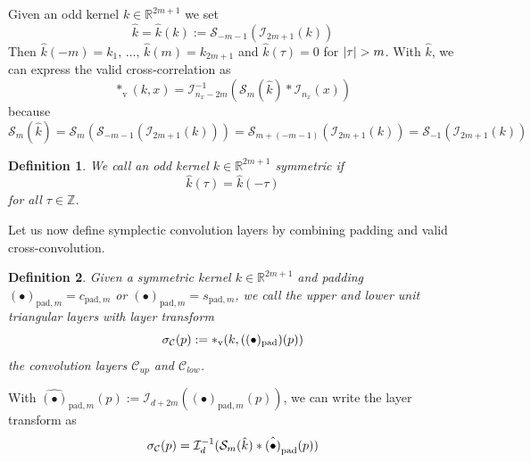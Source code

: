 \documentclass[twoside,a4paper]{article}
\newtheorem{definition}{Definition}
\begin{document}
Given an odd kernel $k \in \mathbb{R}^{2m+1}$ we set
\begin{equation*}
	\hat{k} = \hat{k}(k) := \mathcal{S}_{-m-1}(\mathcal{I}_{2m+1}(k))
\end{equation*}
Then $\hat{k}(-m) = k_1, \, \dots,\, \hat{k}(m) = k_{2m+1}$ and
$\hat{k}(\tau)=0$ for $\left|{\tau}\right| > m$. With $\hat{k}$, we can express the valid cross-correlation as
\begin{equation*}
	*_{\text{v}}(k,x) = \mathcal{I}_{n_x-2m}^{-1} (
		\mathcal{S}_{m}(\hat{k}) * \mathcal{I}_{n_x}(x)
	)
\end{equation*}
because
\begin{equation*}
	\mathcal{S}_{m}(\hat{k}) 
	= \mathcal{S}_{m}(\mathcal{S}_{-m-1}(\mathcal{I}_{2m+1}(k)))
	= \mathcal{S}_{m+(-m-1)}(\mathcal{I}_{2m+1}(k))
	= \mathcal{S}_{-1}(\mathcal{I}_{2m+1}(k))
\end{equation*}

\begin{definition}
	We call an odd kernel $k \in \mathbb{R}^{2m+1}$ symmetric if
	\begin{equation*}
		\hat{k}(\tau) = \hat{k}(-\tau)
	\end{equation*}
	for all $\tau \in \mathbb{Z}$.
\end{definition}

Let us now define symplectic convolution layers by combining padding and valid 
cross-convolution.
\begin{definition}
	Given a symmetric kernel $k \in \mathbb{R}^{2m+1}$ and padding
	$(\bullet)_{\text{pad},m} = c_{\text{pad},m}$ or $(\bullet)_{\text{pad},m} = s_{\text{pad},m}$,
	we call the upper and lower unit triangular layers with layer transform
	\begin{equation*}
		\sigma_{\mathcal{C}}(p) := *_{\text{v}}(k,((\bullet)_{\text{pad}})(p))
	\end{equation*}
	the convolution layers $\mathcal{C}_{up}$ and $\mathcal{C}_{low}$.
\end{definition}

With $\hat{(\bullet)}_{\text{pad},m}(p) := \mathcal{I}_{d+2m}((\bullet)_{\text{pad},m}(p))$,
we can write the layer transform as
\begin{equation}\label{eq_conv_layer_transform}
	\sigma_{\mathcal{C}}(p) =
	\mathcal{I}_{d}^{-1} (
		\mathcal{S}_{m}(\hat{k}) * \hat{(\bullet)}_{\text{pad}}(p)
	)
\end{equation}
\end{document}
